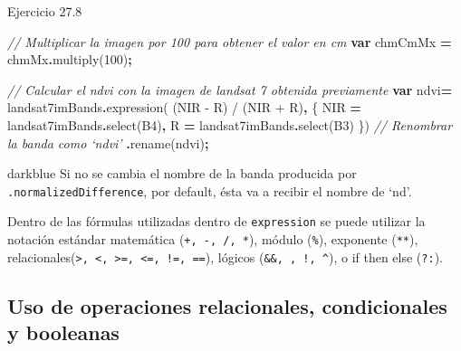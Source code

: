 \documentclass[
  12pt,
  letterpaper,
  twoside]{book}
\newenvironment{Shaded}{\begin{snugshade}}{\end{snugshade}}
\newcommand{\CommentTok}[1]{\textcolor[rgb]{0.56,0.35,0.01}{\textit{#1}}}
\newcommand{\DecValTok}[1]{\textcolor[rgb]{0.00,0.00,0.81}{#1}}
\newcommand{\FunctionTok}[1]{\textcolor[rgb]{0.00,0.00,0.00}{#1}}
\newcommand{\KeywordTok}[1]{\textcolor[rgb]{0.13,0.29,0.53}{\textbf{#1}}}
\newcommand{\NormalTok}[1]{#1}
\newcommand{\OperatorTok}[1]{\textcolor[rgb]{0.81,0.36,0.00}{\textbf{#1}}}
\newcommand{\StringTok}[1]{\textcolor[rgb]{0.31,0.60,0.02}{#1}}
\begin{document}
Ejercicio 27.8

\begin{Shaded}
\begin{Highlighting}[]
\CommentTok{// Multiplicar la imagen por 100 para obtener el valor en cm}
\KeywordTok{var}\NormalTok{ chmCmMx }\OperatorTok{=}\NormalTok{ chmMx}\OperatorTok{.}\FunctionTok{multiply}\NormalTok{(}\DecValTok{100}\NormalTok{)}\OperatorTok{;}

\CommentTok{// Calcular el ndvi con la imagen de landsat 7 obtenida previamente}
\KeywordTok{var}\NormalTok{ ndvi}\OperatorTok{=}\NormalTok{ landsat7imBands}\OperatorTok{.}\FunctionTok{expression}\NormalTok{( }\StringTok{\textquotesingle{}(NIR {-} R) / (NIR + R)\textquotesingle{}}\OperatorTok{,}\NormalTok{ \{}
  \StringTok{\textquotesingle{}NIR\textquotesingle{}} \OperatorTok{=}\NormalTok{ landsat7imBands}\OperatorTok{.}\FunctionTok{select}\NormalTok{(}\StringTok{\textquotesingle{}B4\textquotesingle{}}\NormalTok{)}\OperatorTok{,}
  \StringTok{\textquotesingle{}R\textquotesingle{}} \OperatorTok{=}\NormalTok{ landsat7imBands}\OperatorTok{.}\FunctionTok{select}\NormalTok{(}\StringTok{\textquotesingle{}B3\textquotesingle{}}\NormalTok{)}
\NormalTok{\})}
  \CommentTok{// Renombrar la banda como ‘ndvi’}
  \OperatorTok{.}\FunctionTok{rename}\NormalTok{(}\StringTok{\textquotesingle{}ndvi\textquotesingle{}}\NormalTok{)}\OperatorTok{;}
\end{Highlighting}
\end{Shaded}

\begin{bluebox2}

\begin{awesomeblock}{5pt}{\faLightbulb}{darkblue}
Si no se cambia el nombre de la banda producida por \texttt{.normalizedDifference}, por default, ésta va a recibir el nombre de `nd'.

\end{awesomeblock}

\end{bluebox2}

Dentro de las fórmulas utilizadas dentro de \texttt{expression} se puede utilizar la notación estándar matemática (\texttt{+,\ -,\ /,\ *}), módulo (\texttt{\%}), exponente (\texttt{**}), relacionales(\texttt{\textgreater{},\ \textless{},\ \textgreater{}=,\ \textless{}=,\ !=,\ ==}), lógicos (\texttt{\&\&,\ \textbar{}\textbar{},\ !,\ \^{}}), o if then else (\texttt{?:}).

\hypertarget{uso-de-operaciones-relacionales-condicionales-y-booleanas}{%
\subsection{Uso de operaciones relacionales, condicionales y booleanas}\label{uso-de-operaciones-relacionales-condicionales-y-booleanas}}
\end{document}
